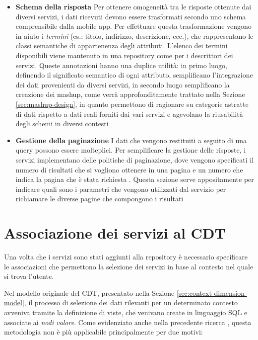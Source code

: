 \begin{itemize}
\begin{enumerate}
	\end{enumerate}
	\item \textbf{Schema della risposta}
	Per ottenere omogeneità tra le risposte ottenute dai diversi servizi, i dati ricevuti devono essere trasformati secondo uno schema comprensibile dalla mobile app. Per effettuare questa trasformazione vengono in aiuto i \emph{termini} (es.: titolo, indirizzo, descrizione, ecc.), che rappresentano le classi semantiche di appartenenza degli attributi. L'elenco dei termini disponibili viene mantenuto in una repository come per i descrittori dei servizi. Queste annotazioni hanno una duplice utilità: in primo luogo, definendo il significato semantico di ogni attributo, semplificano l'integrazione dei dati provenienti da diversi servizi, in secondo luogo semplificano la creazione dei mashup, come verrà approfonditamente trattato nella Sezione \ref{sec:mashup-design}, in quanto permettono di ragionare su categorie astratte di dati rispetto a dati reali forniti dai vari servizi e agevolano la riusabilità degli schemi in diversi contesti 
	\item \textbf{Gestione della paginazione}
	I dati che vengono restituiti a seguito di una query possono essere molteplici. Per semplificare la gestione delle risposte, i servizi implementano delle politiche di paginazione, dove vengono specificati il numero di risultati che si vogliono ottenere in una pagina e un numero che indica la pagina che è stata richiesta \cite{masse2011rest}. Questa sezione serve appositamente per indicare quali sono i parametri che vengono utilizzati dal servizio per richiamare le diverse pagine che compongono i risultati
\end{itemize}

\section{Associazione dei servizi al CDT\label{sec:associazione-servizi-cdt}}

Una volta che i servizi sono stati aggiunti alla repository è necessario specificare le associazioni che permettono la selezione dei servizi in base al contesto nel quale si trova l'utente.

Nel modello originale del CDT, presentato nella Sezione \ref{sec:context-dimension-model}, il processo di selezione dei dati rilevanti per un determinato contesto avveniva tramite la definizione di viste, che venivano create in linguaggio SQL e associate ai \emph{nodi valore}. Come evidenziato anche nella precedente ricerca \cite{rizzo2015progettazione}, questa metodologia non è più applicabile principalmente per due motivi:


